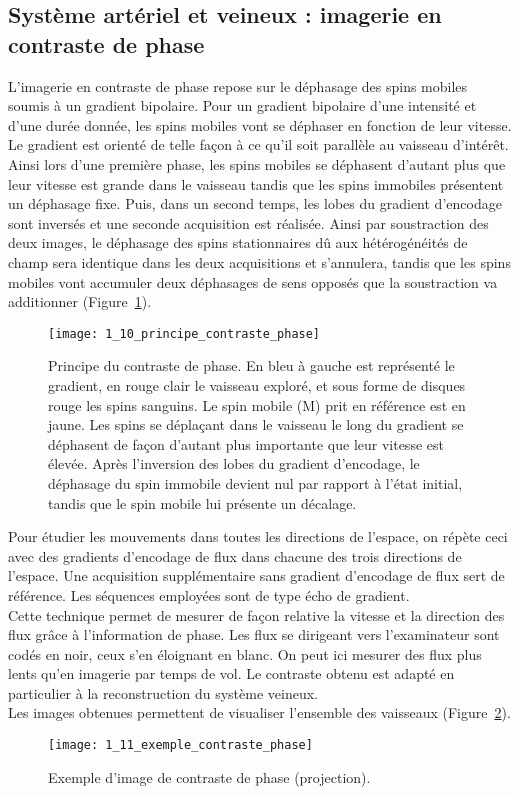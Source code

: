 \subsection{Système artériel et veineux : imagerie en contraste de phase}
L’imagerie en contraste de phase repose sur le déphasage des spins mobiles soumis à un gradient bipolaire. Pour un gradient bipolaire d’une intensité et d’une durée donnée, les spins mobiles vont se déphaser en fonction de leur vitesse.\\
Le gradient est orienté de telle façon à ce qu’il soit parallèle au vaisseau d’intérêt. Ainsi lors d’une première phase, les spins mobiles se déphasent d’autant plus que leur vitesse est grande dans le vaisseau tandis que les spins immobiles présentent un déphasage fixe. Puis, dans un second temps, les lobes du gradient d’encodage sont inversés et une seconde acquisition est réalisée. Ainsi par soustraction des deux images, le déphasage des spins stationnaires dû aux hétérogénéités de champ sera identique dans les deux acquisitions et s’annulera, tandis que les spins mobiles vont accumuler deux déphasages de sens opposés que la soustraction va additionner (Figure~\ref{fig:1_10_principe_contraste_phase}).\\
\begin{figure}[!t]
\centering
\texttt{[image: 1\_10\_principe\_contraste\_phase]}
\caption{Principe du contraste de phase. En bleu à gauche est représenté le gradient, en rouge clair le vaisseau exploré, et sous forme de disques rouge les spins sanguins. Le spin mobile (M) prit en référence est en jaune. Les spins se déplaçant dans le vaisseau le long du gradient se déphasent de façon d’autant plus importante que leur vitesse est élevée. Après l’inversion des lobes du gradient d’encodage, le déphasage du spin immobile devient nul par rapport à l’état initial, tandis que le spin mobile lui présente un décalage. }
\label{fig:1_10_principe_contraste_phase}	
\end{figure}
Pour étudier les mouvements dans toutes les directions de l’espace, on répète ceci avec des gradients d’encodage de flux dans chacune des trois directions de l’espace. Une acquisition supplémentaire sans gradient d’encodage de flux sert de référence. Les séquences employées sont de type écho de gradient.\\
Cette technique permet de mesurer de façon relative la vitesse et la direction des flux grâce à l’information de phase. Les flux se dirigeant vers l’examinateur sont codés en noir, ceux s’en éloignant en blanc. On peut ici mesurer des flux plus lents qu’en imagerie par temps de vol. Le contraste obtenu est adapté en particulier à la reconstruction du système veineux.\\
Les images obtenues permettent de visualiser l’ensemble des vaisseaux (Figure~\ref{fig:1_11_exemple_contraste_phase}).
\begin{figure}[!b]
\centering
\texttt{[image: 1\_11\_exemple\_contraste\_phase]}
\caption{Exemple d'image de contraste de phase (projection).}
\label{fig:1_11_exemple_contraste_phase}	
\end{figure}

